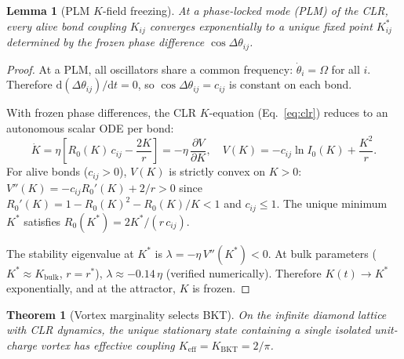 \documentclass[aps,prd,onecolumn,superscriptaddress,floatfix,12pt]{revtex4-2}
\newcommand{\Rzero}{R_0}
\newcommand{\Kbulk}{K_{\text{bulk}}}
\newcommand{\KBKT}{K_{\text{BKT}}}
\newtheorem{theorem}{Theorem}[section]
\newtheorem{lemma}{Lemma}[section]
\begin{document}
\begin{lemma}[PLM $K$-field freezing]\label{lem:plm-freezing}
At a phase-locked mode (PLM) of the CLR, every alive bond coupling $K_{ij}$ converges exponentially to a unique fixed point $K^*_{ij}$ determined by the frozen phase difference $\cos\Delta\theta_{ij}$.
\end{lemma}

\begin{proof}
At a PLM, all oscillators share a common frequency: $\dot\theta_i = \Omega$ for all $i$. Therefore $\mathrm{d}(\Delta\theta_{ij})/\mathrm{d}t = 0$, so $\cos\Delta\theta_{ij} = c_{ij}$ is constant on each bond.

With frozen phase differences, the CLR $K$-equation (Eq.~\ref{eq:clr}) reduces to an autonomous scalar ODE per bond:
\begin{equation}\label{eq:plm-ode}
\dot{K} = \eta\!\left[\Rzero(K)\,c_{ij} - \frac{2K}{r}\right] = -\eta\,\frac{\partial V}{\partial K}, \quad V(K) = -c_{ij}\ln I_0(K) + \frac{K^2}{r}.
\end{equation}
For alive bonds ($c_{ij} > 0$), $V(K)$ is strictly convex on $K > 0$: $V''(K) = -c_{ij}\Rzero'(K) + 2/r > 0$ since $\Rzero'(K) = 1 - \Rzero(K)^2 - \Rzero(K)/K < 1$ and $c_{ij} \le 1$. The unique minimum $K^*$ satisfies $\Rzero(K^*) = 2K^*/(r\,c_{ij})$.

The stability eigenvalue at $K^*$ is $\lambda = -\eta\,V''(K^*) < 0$. At bulk parameters ($K^* \approx \Kbulk$, $r = r^*$), $\lambda \approx -0.14\,\eta$ (verified numerically). Therefore $K(t) \to K^*$ exponentially, and at the attractor, $K$ is frozen.
\end{proof}

\begin{theorem}[Vortex marginality selects BKT]\label{thm:vortex-marginality}
On the infinite diamond lattice with CLR dynamics, the unique stationary state containing a single isolated unit-charge vortex has effective coupling $K_{\text{eff}} = \KBKT = 2/\pi$.
\end{theorem}
\end{document}
